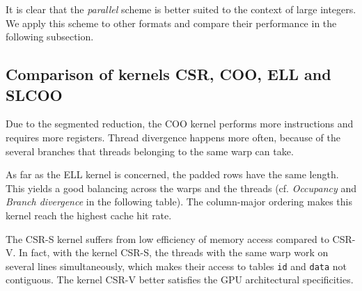 \documentclass[runningheads,orivec]{llncs}
\begin{document}
\vspace*{-0.25cm}

It is clear that the \textit{parallel} scheme is better suited to the context of large integers. We apply this scheme to other formats and compare their performance in the following subsection.

\vspace*{-0.25cm}
\subsection{Comparison of kernels CSR, COO, ELL and SLCOO}
\label{subsection: comparison kernels}
\vspace*{-0.25cm}

Due to the segmented reduction, the COO kernel performs more instructions and requires more registers. Thread divergence happens more often, because of the several branches that threads belonging to the same warp can take.

As far as the ELL kernel is concerned, the padded rows have the same length. This yields a good balancing across the warps and the threads (cf. \textit{Occupancy} and \textit{Branch divergence} in the following table). The column-major ordering makes this kernel reach the highest cache hit rate.  

The CSR-S kernel suffers from low efficiency of memory access compared to CSR-V. In fact, with the kernel CSR-S, the threads with the same warp work on several lines simultaneously, which makes their access to tables \texttt{id} and \texttt{data} not contiguous. The kernel CSR-V better satisfies the GPU architectural specificities.

\vspace*{-0.25cm}
\end{document}
